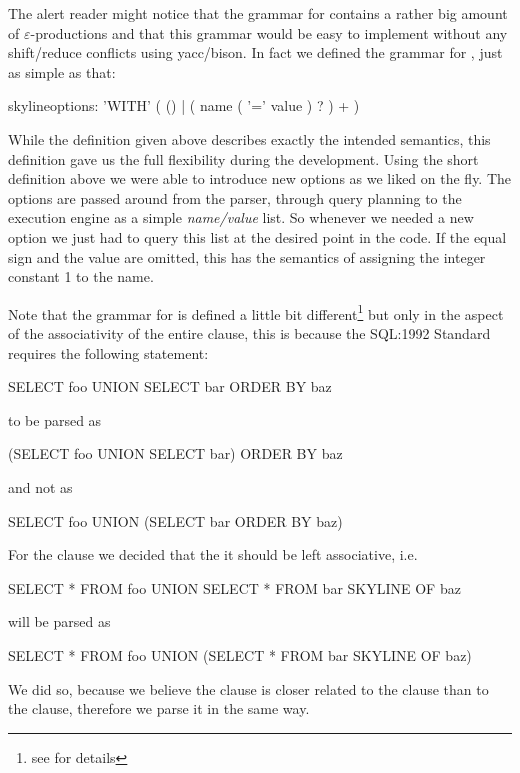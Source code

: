 The alert reader might notice that the grammar for 
contains a rather big amount of $\varepsilon$-productions and that this
grammar would be easy to implement without any shift/reduce conflicts
using yacc/bison. In fact we defined the grammar for
, just as simple as that:

\begin{rail}
skylineoptions:
    'WITH' ( () | ( name ( '=' value ) ? ) + )
\end{rail}

While the definition given above describes exactly the intended
semantics, this definition gave us the full flexibility during the
development. Using the short definition above we were able to
introduce new options as we liked on the fly.  The options are passed
around from the parser, through query planning to the execution engine
as a simple \emph{name/value} list.  So whenever we needed a new
option we just had to query this list at the desired point in the
code. If the equal sign and the value are omitted, this has the
semantics of assigning the integer constant 1 to the name.

Note that the grammar for  is defined
a little bit different\footnote{see 
for details} but only in the aspect of the associativity of the entire
 clause, this is because the SQL:1992 Standard
\citep{SQL92} requires the following statement:

\begin{sql}SELECT foo UNION SELECT bar ORDER BY baz\end{sql}
to be parsed as
\begin{sql}(SELECT foo UNION SELECT bar) ORDER BY baz\end{sql}
and not as
\begin{sql}SELECT foo UNION (SELECT bar ORDER BY baz)\end{sql}

\noindent{}For the  clause we decided that the it should be left
associative, i.e. 
\begin{sql}SELECT * FROM foo UNION SELECT * FROM bar SKYLINE OF baz\end{sql}
will be parsed as 
\begin{sql}SELECT * FROM foo UNION (SELECT * FROM bar SKYLINE OF baz)\end{sql}

\noindent{}We did so, because we believe the  clause is closer
related to the  clause than to the 
clause, therefore we parse it in the same way.


